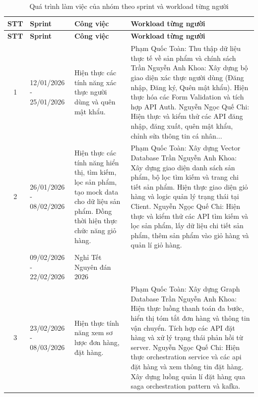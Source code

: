 \vspace{0.5cm}
\begin{longtable}{|c|p{2cm}|p{3.5cm}|p{6cm}|}
\caption{Quá trình làm việc của nhóm theo sprint và workload từng người}
\label{tab:task-assigment} \\

\hline
\textbf{STT} & \textbf{Sprint} & \textbf{Công việc} & \textbf{Workload từng người} \\
\hline
\endfirsthead

\hline
\textbf{STT} & \textbf{Sprint} & \textbf{Công việc} & \textbf{Workload từng người} \\
\hline
\endhead

\hline
\endfoot

\hline
\endlastfoot

1 & 12/01/2026 - 25/01/2026 & Hiện thực các tính năng xác thực người dùng và quên mật khẩu. &
Phạm Quốc Toàn: Thu thập dữ liệu thực tế về sản phẩm và chính sách\newline
Trần Nguyễn Anh Khoa: Xây dựng bộ giao diện xác thực người dùng (Đăng nhập, Đăng ký, Quên mật khẩu). Hiện thực hóa các Form Validation và tích hợp API Auth. \newline
Nguyễn Ngọc Quế Chi: Hiện thực và kiểm thử các API đăng nhập, đăng xuất, quên mật khẩu, chỉnh sửa thông tin cá nhân... \\ \hline

2 & 26/01/2026 - 08/02/2026 & Hiện thực các tính năng hiển thị, tìm kiếm, lọc sản phẩm, tạo mock data cho dữ liệu sản phẩm. Đồng thời hiện thực chức năng giỏ hàng. &
Phạm Quốc Toàn: Xây dựng Vector Database\newline
Trần Nguyễn Anh Khoa: Xây dựng giao diện danh sách sản phẩm, bộ lọc tìm kiếm và trang chi tiết sản phẩm. Hiện thực giao diện giỏ hàng và logic quản lý trạng thái tại Client. \newline
Nguyễn Ngọc Quế Chi: Hiện thực và kiểm thử các API tìm kiếm và lọc sản phẩm, lấy dữ liệu chi tiết sản phẩm, thêm sản phẩm vào giỏ hàng và quản lí giỏ hàng. \\ \hline

 & 09/02/2026 - 22/02/2026 & Nghỉ Tết Nguyên đán 2026 & \\ \hline

3 & 23/02/2026 - 08/03/2026 & Hiện thực tính năng xem sơ lược đơn hàng, đặt hàng. &
Phạm Quốc Toàn: Xây dựng Graph Database\newline
Trần Nguyễn Anh Khoa: Hiện thực luồng thanh toán đa bước, hiển thị tóm tắt đơn hàng và thông tin vận chuyển. Tích hợp các API đặt hàng và xử lý trạng thái phản hồi từ server. \newline
Nguyễn Ngọc Quế Chi: Hiện thực orchestration service và các api đặt hàng và xem thông tin đặt hàng. Xây dựng luồng quản lí đặt hàng qua saga orchestration pattern và kafka. \\ \hline


\end{longtable}
